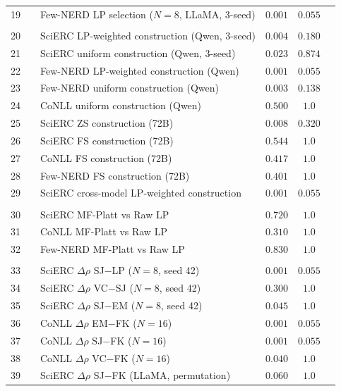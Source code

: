 \begin{table}[t]
\begin{tabular}{clllcc}
19 & & Few-NERD LP selection ($N{=}8$, LLaMA, 3-seed) & $0.001$ & $0.055$ &  \\
\addlinespace
\multicolumn{6}{l}{\textit{Construction}} \\
20 & & SciERC LP-weighted construction (Qwen, 3-seed) & $0.004$ & $0.180$ &  \\
21 & & SciERC uniform construction (Qwen, 3-seed) & $0.023$ & $0.874$ &  \\
22 & & Few-NERD LP-weighted construction (Qwen) & $0.001$ & $0.055$ &  \\
23 & & Few-NERD uniform construction (Qwen) & $0.003$ & $0.138$ &  \\
24 & & CoNLL uniform construction (Qwen) & $0.500$ & $1.0$ &  \\
25 & & SciERC ZS construction (72B) & $0.008$ & $0.320$ &  \\
26 & & SciERC FS construction (72B) & $0.544$ & $1.0$ &  \\
27 & & CoNLL FS construction (72B) & $0.417$ & $1.0$ &  \\
28 & & Few-NERD FS construction (72B) & $0.401$ & $1.0$ &  \\
29 & & SciERC cross-model LP-weighted construction & $0.001$ & $0.055$ &  \\
\addlinespace
\multicolumn{6}{l}{\textit{Calibration}} \\
30 & & SciERC MF-Platt vs Raw LP & $0.720$ & $1.0$ &  \\
31 & & CoNLL MF-Platt vs Raw LP & $0.310$ & $1.0$ &  \\
32 & & Few-NERD MF-Platt vs Raw LP & $0.830$ & $1.0$ &  \\
\addlinespace
\multicolumn{6}{l}{\textit{Signal $\Delta\rho$}} \\
33 & & SciERC $\Delta\rho$ SJ$-$LP ($N{=}8$, seed 42) & $0.001$ & $0.055$ &  \\
34 & & SciERC $\Delta\rho$ VC$-$SJ ($N{=}8$, seed 42) & $0.300$ & $1.0$ &  \\
35 & & SciERC $\Delta\rho$ SJ$-$EM ($N{=}8$, seed 42) & $0.045$ & $1.0$ &  \\
36 & & CoNLL $\Delta\rho$ EM$-$FK ($N{=}16$) & $0.001$ & $0.055$ &  \\
37 & & CoNLL $\Delta\rho$ SJ$-$FK ($N{=}16$) & $0.001$ & $0.055$ &  \\
38 & & CoNLL $\Delta\rho$ VC$-$FK ($N{=}16$) & $0.040$ & $1.0$ &  \\
39 & & SciERC $\Delta\rho$ SJ$-$FK (LLaMA, permutation) & $0.060$ & $1.0$ &  \\

\end{tabular}
\end{table}
